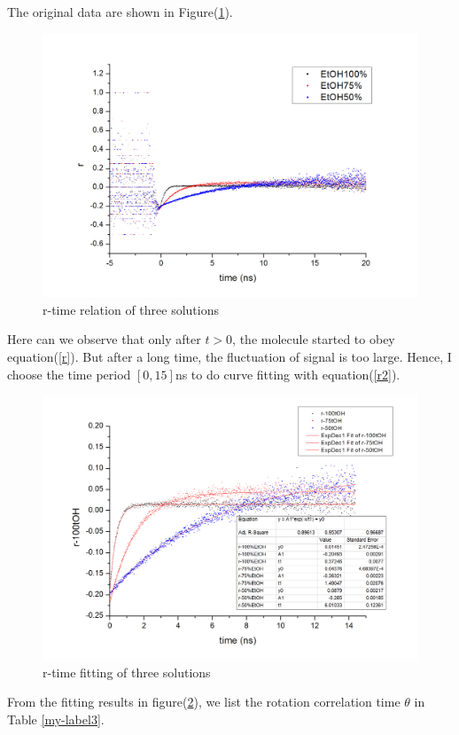 \documentclass{article}
\begin{document}
The original data are shown in Figure(\ref{r-time}).
\begin{figure}
\begin{center}
\includegraphics[width=15cm]{Graph3}
\caption{r-time relation of three solutions}
\label{r-time}
\end{center}
\end{figure}
\par 
Here can we observe that only after $t>0$, the molecule started to obey equation(\ref{r}). But after a long time, the fluctuation of signal is too large. Hence, I choose the time period $[0,15]$ns to do curve fitting with equation(\ref{r2}). \par

\begin{figure}
\begin{center}
\includegraphics[width=15cm]{Graph2}
\caption{r-time fitting of three solutions}
\label{r-time-fitting}
\end{center}
\end{figure}
\par 
From the fitting results in figure(\ref{r-time-fitting}), we list the rotation correlation time $\theta$  in Table \ref{my-label3}.\par
\end{document}
